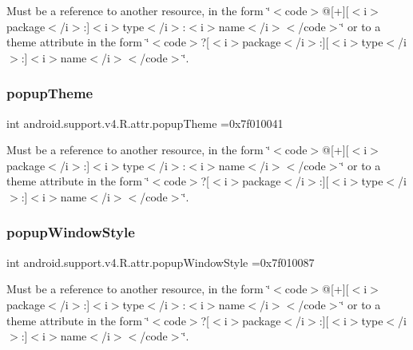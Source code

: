 Must be a reference to another resource, in the form \char`\"{}$<$code$>$@\mbox{[}+\mbox{]}\mbox{[}$<$i$>$package$<$/i$>$\+:\mbox{]}$<$i$>$type$<$/i$>$\+:$<$i$>$name$<$/i$>$$<$/code$>$\char`\"{} or to a theme attribute in the form \char`\"{}$<$code$>$?\mbox{[}$<$i$>$package$<$/i$>$\+:\mbox{]}\mbox{[}$<$i$>$type$<$/i$>$\+:\mbox{]}$<$i$>$name$<$/i$>$$<$/code$>$\char`\"{}. \mbox{\label{classandroid_1_1support_1_1v4_1_1R_1_1attr_a05446418402decb6877749b6de8bc2d8}} 
\subsubsection{\texorpdfstring{popup\+Theme}{popupTheme}}
{\footnotesize\ttfamily int android.\+support.\+v4.\+R.\+attr.\+popup\+Theme =0x7f010041\hspace{0.3cm}{\ttfamily [static]}}

Must be a reference to another resource, in the form \char`\"{}$<$code$>$@\mbox{[}+\mbox{]}\mbox{[}$<$i$>$package$<$/i$>$\+:\mbox{]}$<$i$>$type$<$/i$>$\+:$<$i$>$name$<$/i$>$$<$/code$>$\char`\"{} or to a theme attribute in the form \char`\"{}$<$code$>$?\mbox{[}$<$i$>$package$<$/i$>$\+:\mbox{]}\mbox{[}$<$i$>$type$<$/i$>$\+:\mbox{]}$<$i$>$name$<$/i$>$$<$/code$>$\char`\"{}. \mbox{\label{classandroid_1_1support_1_1v4_1_1R_1_1attr_a4927a489f5738a700c74abb08ce2efd0}} 
\subsubsection{\texorpdfstring{popup\+Window\+Style}{popupWindowStyle}}
{\footnotesize\ttfamily int android.\+support.\+v4.\+R.\+attr.\+popup\+Window\+Style =0x7f010087\hspace{0.3cm}{\ttfamily [static]}}

Must be a reference to another resource, in the form \char`\"{}$<$code$>$@\mbox{[}+\mbox{]}\mbox{[}$<$i$>$package$<$/i$>$\+:\mbox{]}$<$i$>$type$<$/i$>$\+:$<$i$>$name$<$/i$>$$<$/code$>$\char`\"{} or to a theme attribute in the form \char`\"{}$<$code$>$?\mbox{[}$<$i$>$package$<$/i$>$\+:\mbox{]}\mbox{[}$<$i$>$type$<$/i$>$\+:\mbox{]}$<$i$>$name$<$/i$>$$<$/code$>$\char`\"{}. \mbox{\label{classandroid_1_1support_1_1v4_1_1R_1_1attr_ae2c236de8d06fbd2175fc1c3631a8073}} 
